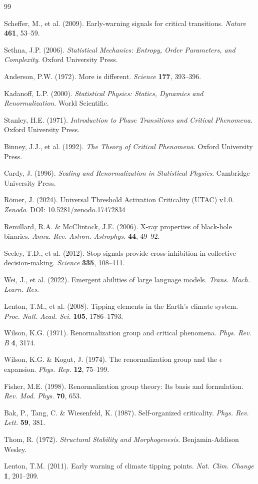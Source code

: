 \documentclass[11pt,letterpaper]{article}
\begin{document}
\begin{thebibliography}{99}

Scheffer, M., et al. (2009). Early-warning signals for critical transitions. \textit{Nature} \textbf{461}, 53--59.

Sethna, J.P. (2006). \textit{Statistical Mechanics: Entropy, Order Parameters, and Complexity}. Oxford University Press.

Anderson, P.W. (1972). More is different. \textit{Science} \textbf{177}, 393--396.

Kadanoff, L.P. (2000). \textit{Statistical Physics: Statics, Dynamics and Renormalization}. World Scientific.

Stanley, H.E. (1971). \textit{Introduction to Phase Transitions and Critical Phenomena}. Oxford University Press.

Binney, J.J., et al. (1992). \textit{The Theory of Critical Phenomena}. Oxford University Press.

Cardy, J. (1996). \textit{Scaling and Renormalization in Statistical Physics}. Cambridge University Press.

Römer, J. (2024). Universal Threshold Activation Criticality (UTAC) v1.0. \textit{Zenodo}. DOI: 10.5281/zenodo.17472834

Remillard, R.A. \& McClintock, J.E. (2006). X-ray properties of black-hole binaries. \textit{Annu. Rev. Astron. Astrophys.} \textbf{44}, 49--92.

Seeley, T.D., et al. (2012). Stop signals provide cross inhibition in collective decision-making. \textit{Science} \textbf{335}, 108--111.

Wei, J., et al. (2022). Emergent abilities of large language models. \textit{Trans. Mach. Learn. Res.}

Lenton, T.M., et al. (2008). Tipping elements in the Earth's climate system. \textit{Proc. Natl. Acad. Sci.} \textbf{105}, 1786--1793.

Wilson, K.G. (1971). Renormalization group and critical phenomena. \textit{Phys. Rev. B} \textbf{4}, 3174.

Wilson, K.G. \& Kogut, J. (1974). The renormalization group and the $\epsilon$ expansion. \textit{Phys. Rep.} \textbf{12}, 75--199.

Fisher, M.E. (1998). Renormalization group theory: Its basis and formulation. \textit{Rev. Mod. Phys.} \textbf{70}, 653.

Bak, P., Tang, C. \& Wiesenfeld, K. (1987). Self-organized criticality. \textit{Phys. Rev. Lett.} \textbf{59}, 381.

Thom, R. (1972). \textit{Structural Stability and Morphogenesis}. Benjamin-Addison Wesley.

Lenton, T.M. (2011). Early warning of climate tipping points. \textit{Nat. Clim. Change} \textbf{1}, 201--209.

\end{thebibliography}
\end{document}
